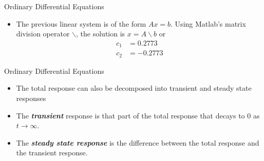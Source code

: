 \begin{frame}
Ordinary Differential Equations
 \begin{itemize}
 \item The previous linear system is of the form $Ax=b$.  Using
 Matlab's matrix division operator $\backslash$, the solution is
 $x = A\backslash b$ or
\begin{align*}
  c_1 & =    0.2773 \\
  c_2 & =   -0.2773
\end{align*}
\end{itemize}
\end{frame}
\begin{frame}
Ordinary Differential Equations
 \begin{itemize}
 \item The total response can also be decomposed into transient
 and steady state responses
 \item The \textit{\textbf{transient}} response is that part of the total response
 that decays to 0 as $t\rightarrow \infty$.
 \item The \textit{\textbf{steady state response}} is the difference between the
 total response and the transient response.
\end{itemize}
\end{frame}

